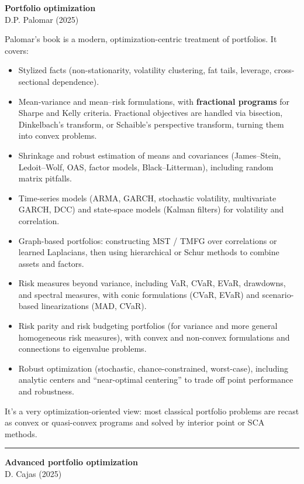 \documentclass[a5paper]{article}
\providecommand{\tightlist}{%
  \setlength{\itemsep}{0pt}\setlength{\parskip}{0pt}}
\begin{document}
\textbf{Portfolio optimization}\\
D.P. Palomar (2025)

Palomar's book is a modern, optimization-centric treatment of
portfolios. It covers:

\begin{itemize}
\tightlist
\item
  Stylized facts (non-stationarity, volatility clustering, fat tails,
  leverage, cross-sectional dependence).
\item
  Mean-variance and mean--risk formulations, with \textbf{fractional
  programs} for Sharpe and Kelly criteria. Fractional objectives are
  handled via bisection, Dinkelbach's transform, or Schaible's
  perspective transform, turning them into convex problems.
\item
  Shrinkage and robust estimation of means and covariances
  (James--Stein, Ledoit--Wolf, OAS, factor models, Black--Litterman),
  including random matrix pitfalls.
\item
  Time-series models (ARMA, GARCH, stochastic volatility, multivariate
  GARCH, DCC) and state-space models (Kalman filters) for volatility and
  correlation.
\item
  Graph-based portfolios: constructing MST / TMFG over correlations or
  learned Laplacians, then using hierarchical or Schur methods to
  combine assets and factors.
\item
  Risk measures beyond variance, including VaR, CVaR, EVaR, drawdowns,
  and spectral measures, with conic formulations (CVaR, EVaR) and
  scenario-based linearizations (MAD, CVaR).
\item
  Risk parity and risk budgeting portfolios (for variance and more
  general homogeneous risk measures), with convex and non-convex
  formulations and connections to eigenvalue problems.
\item
  Robust optimization (stochastic, chance-constrained, worst-case),
  including analytic centers and ``near-optimal centering'' to trade off
  point performance and robustness.
\end{itemize}

It's a very optimization-oriented view: most classical portfolio
problems are recast as convex or quasi-convex programs and solved by
interior point or SCA methods.

\begin{center}\rule{0.5\linewidth}{0.5pt}\end{center}

\textbf{Advanced portfolio optimization}\\
D. Cajas (2025)
\end{document}
